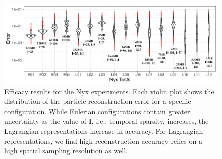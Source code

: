 \begin{figure}[!t]
\centering
\includegraphics[width=\linewidth]{Images/nyx_violinplot.pdf}
\vspace{-5mm}
\caption{Efficacy results for the Nyx experiments. Each violin plot shows the distribution of the particle reconstruction error for a specific configuration. While Eulerian configurations contain greater uncertainty as the value of \textbf{I}, i.e., temporal sparsity, increases, the Lagrangian representations increase in accuracy. For Lagrangian representations, we find high reconstruction accuracy relies on a high spatial sampling resolution as well.}
\label{fig:nyx_violinplot}
\end{figure}
